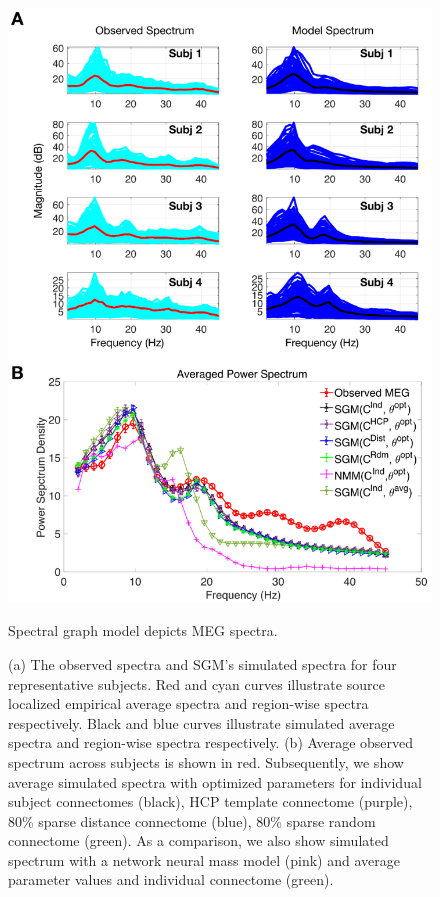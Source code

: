 \begin{figure}[htbp]
    \centering
    \includegraphics[scale=0.85]{../figures/chapter5/fig3_spectra_fit.png}
    \caption{Spectral graph model depicts MEG spectra.}
    \caption*{(a) The observed spectra and SGM's simulated spectra for four representative subjects. Red and cyan curves illustrate source localized empirical average spectra and region-wise spectra respectively. Black and blue curves illustrate simulated average spectra and region-wise spectra respectively. (b) Average observed spectrum across subjects is shown in red. Subsequently, we show average simulated spectra with optimized parameters for individual subject connectomes (black), HCP template connectome (purple), 80\% sparse distance connectome (blue), 80\% sparse random connectome (green). As a comparison, we also show simulated spectrum with a network neural mass model (pink) and average parameter values and individual connectome (green).}
    \label{fig:spectra_fit}
\end{figure}

